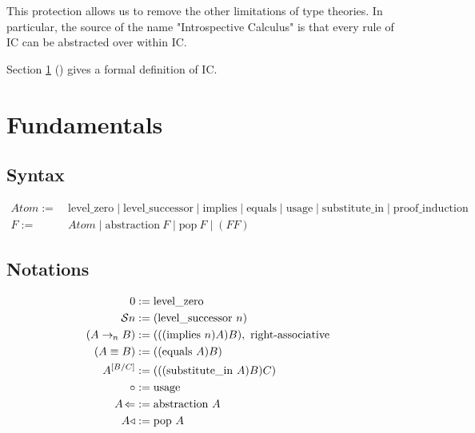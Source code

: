 \documentclass{article}
\begin{document}
  This protection allows us to remove the other limitations of type theories.
  In particular, the source of the name "Introspective Calculus" is that every rule of IC can be abstracted over within IC.



  
  Section \ref{fundamentals} (\textit{}) gives a formal definition of IC.  

  \section{Fundamentals}\label{fundamentals}

  \subsection{Syntax}
  \begin{align*}
     Atom :=&\ \mathrm{level\_zero} \mid \mathrm{level\_successor} \mid \mathrm{implies} \mid \mathrm{equals} \mid \mathrm{usage} \mid \mathrm{substitute\_in} \mid \mathrm{proof\_induction}\\
     F :=&\ Atom \mid \mathrm{abstraction}\ F \mid \mathrm{pop}\ F \mid (F F)
  \end{align*}

  \subsection{Notations}
  

  \newcommand{\ic}[1]{#1}
  \newcommand{\abst}[1]{#1\!\Leftarrow}
  \newcommand{\context}[2]{\mlq#1/#2\mrq}
  \newcommand{\variable}[1]{{\mathcal{V}_{\mlq\hspace{-0.06em}#1\hspace{-0.06em}\mrq}}}
  \newcommand{\clocksub}[1]{\text{\clock}_{\!#1}}
  \newcommand{\nameabst}[1]{#1 \Rightarrow}
  \newcommand{\axiom}[2]{\mathrm{Axiom}\ #1\ \mathrm{says}\ #2}
  \newcommand{\axiomatic}[1]{\infty #1}
  \newcommand{\usage}{\circ}
  \newcommand{\pop}[1]{#1\triangleleft}
  \newcommand{\subst}[3]{#1^{[{#2}{/}{#3}]}}

  \begin{align*}
    \lzero &:= \mathrm{level\_zero}\\
    \lsucc{n} &:= (\mathrm{level\_successor}\ n)\\
    (A \implies{n} B) &:= (((\mathrm{implies}\ n) A) B),\ \operatorname{right-associative}\\
    (A \equiv B) &:= ((\mathrm{equals}\ A) B)\\
    \subst{A}{B}{C} &:= (((\mathrm{substitute\_in}\ A) B) C)\\
    \usage &:= \mathrm{usage}\\
    \abst{A} &:= \mathrm{abstraction}\ A\\
    \pop{A} &:= \mathrm{pop}\ A\\
  \end{align*}
\end{document}
